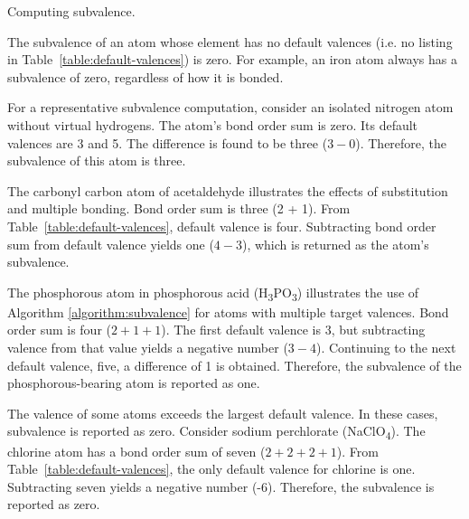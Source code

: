 \documentclass{article}
\begin{document}
\begin{algorithm}
    \caption{Computing subvalence.}
    \label{algorithm:subvalence}
    
\end{algorithm}

The subvalence of an atom whose element has no default valences (i.e. no listing in Table~\ref{table:default-valences}) is zero. For example, an iron atom always has a subvalence of zero, regardless of how it is bonded.

For a representative subvalence computation, consider an isolated nitrogen atom without virtual hydrogens. The atom's bond order sum is zero. Its default valences are 3 and 5. The difference is found to be three ($3 - 0$). Therefore, the subvalence of this atom is three.

The carbonyl carbon atom of acetaldehyde illustrates the effects of substitution and multiple bonding. Bond order sum is three (2 + 1). From Table~\ref{table:default-valences}, default valence is four. Subtracting bond order sum from default valence yields one ($4 - 3$), which is returned as the atom's subvalence.

The phosphorous atom in phosphorous acid (H\textsubscript{3}PO\textsubscript{3}) illustrates the use of Algorithm \ref{algorithm:subvalence} for atoms with multiple target valences. Bond order sum is four ($2 + 1 + 1$). The first default valence is 3, but subtracting valence from that value yields a negative number ($3 - 4$). Continuing to the next default valence, five, a difference of 1 is obtained. Therefore, the subvalence of the phosphorous-bearing atom is reported as one.

The valence of some atoms exceeds the largest default valence. In these cases, subvalence is reported as zero. Consider sodium perchlorate (NaClO\textsubscript{4}). The chlorine atom has a bond order sum of seven ($2 + 2 + 2 + 1$). From Table~\ref{table:default-valences}, the only default valence for chlorine is one. Subtracting seven yields a negative number (-6). Therefore, the subvalence is reported as zero.
\end{document}
